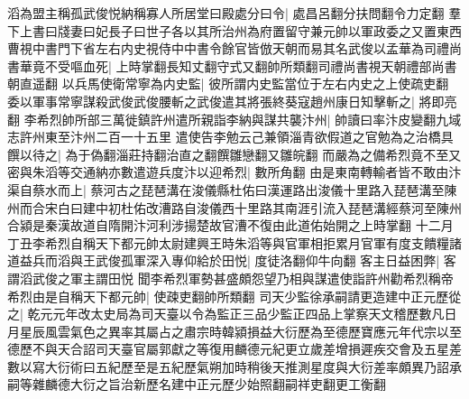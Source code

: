 滔為盟主稱孤武俊悦納稱寡人所居堂曰殿處分曰令|{
	處昌呂翻分扶問翻令力定翻}
羣下上書曰牋妻曰妃長子曰世子各以其所治州為府置留守兼元帥以軍政委之又置東西曹視中書門下省左右内史視侍中中書令餘官皆倣天朝而易其名武俊以孟華為司禮尚書華竟不受嘔血死|{
	上時掌翻長知丈翻守式又翻帥所類翻司禮尚書視天朝禮部尚書朝直遥翻}
以兵馬使衛常寧為内史監|{
	彼所謂内史監當位于左右内史之上使疏吏翻}
委以軍事常寧謀殺武俊武俊腰斬之武俊遣其將張終葵寇趙州康日知擊斬之|{
	將即亮翻}
李希烈帥所部三萬徙鎮許州遣所親詣李納與謀共襲汴州|{
	帥讀曰率汴皮變翻九域志許州東至汴州二百一十五里}
遣使告李勉云己兼領淄青欲假道之官勉為之治橋具饌以待之|{
	為于偽翻淄莊持翻治直之翻饌雛戀翻又雛皖翻}
而嚴為之備希烈竟不至又密與朱滔等交通納亦數遣遊兵度汴以迎希烈|{
	數所角翻}
由是東南轉輸者皆不敢由汴渠自蔡水而上|{
	蔡河古之琵琶溝在浚儀縣杜佑曰漢運路出浚儀十里路入琵琶溝至陳州而合宋白曰建中初杜佑改漕路自浚儀西十里路其南涯引流入琵琶溝經蔡河至陳州合潁是秦漢故道自隋開汴河利涉揚楚故官漕不復由此道佑始開之上時掌翻}
十二月丁丑李希烈自稱天下都元帥太尉建興王時朱滔等與官軍相拒累月官軍有度支饋糧諸道益兵而滔與王武俊孤軍深入專仰給於田悦|{
	度徒洛翻仰牛向翻}
客主日益困弊|{
	客謂滔武俊之軍主謂田悦}
聞李希烈軍勢甚盛頗怨望乃相與謀遣使詣許州勸希烈稱帝希烈由是自稱天下都元帥|{
	使疎吏翻帥所類翻}
司天少監徐承嗣請更造建中正元歷從之|{
	乾元元年改太史局為司天臺以令為監正三品少監正四品上掌察天文稽歷數凡日月星辰風雲氣色之異率其屬占之肅宗時韓潁損益大衍歷為至德歷寶應元年代宗以至德歷不與天合詔司天臺官屬郭獻之等復用麟德元紀更立歲差增損遲疾交會及五星差數以寫大衍術曰五紀歷至是五紀歷氣朔加時稍後天推測星度與大衍差率頗異乃詔承嗣等雜麟德大衍之旨治新歷名建中正元歷少始照翻嗣祥吏翻更工衡翻}


